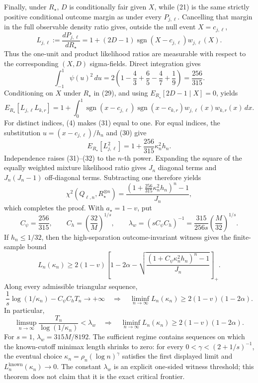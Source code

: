 Finally, under \(R_\star\), \(D\) is conditionally fair given \(X\), while (21) is the same strictly positive conditional outcome margin as under every \(P_{j,\ell}\).  Cancelling that margin in the full observable density ratio gives, outside the null event \(X=c_{j,\ell}\),
\[
L_{j,\ell}:=\frac{dP_{j,\ell}}{dR_\star}
=1+(2D-1)\operatorname{sgn}(X-c_{j,\ell})w_{j,\ell}(X).
\tag{29}
\]
Thus the one-unit and product likelihood ratios are measurable with respect to the corresponding \((X,D)\) sigma-fields.  Direct integration gives
\[
\int_{-1}^{1}\psi(u)^2\,du
=2\left(1-\frac43+\frac65-\frac47+\frac19\right)
=\frac{256}{315}.
\tag{30}
\]
Conditioning on \(X\) under \(R_\star\) in (29), and using \(E_{R_\star}[2D-1\mid X]=0\), yields
\[
E_{R_\star}[L_{j,\ell}L_{k,r}]
=1+\int_0^1
\operatorname{sgn}(x-c_{j,\ell})
\operatorname{sgn}(x-c_{k,r})
w_{j,\ell}(x)w_{k,r}(x)\,dx.
\tag{31}
\]
For distinct indices, (4) makes (31) equal to one.  For equal indices, the substitution \(u=(x-c_{j,\ell})/h_n\) and (30) give
\[
E_{R_\star}[L_{j,\ell}^2]
=1+\frac{256}{315}\kappa_n^2h_n.
\tag{32}
\]
Independence raises (31)--(32) to the \(n\)-th power.  Expanding the square of the equally weighted mixture likelihood ratio gives \(J_n\) diagonal terms and \(J_n(J_n-1)\) off-diagonal terms.  Subtracting one therefore yields
\[
\chi^2(Q_{\ell,n},R_\star^{\otimes n})
=\frac{\left(1+\frac{256}{315}\kappa_n^2h_n\right)^n-1}{J_n},
\]
which completes the proof.
With \(a_\star=1-v\), put
\[
C_\psi=\frac{256}{315},
\qquad
C_h=\left(\frac{32}{M}\right)^{1/s},
\qquad
\lambda_w=(sC_\psi C_h)^{-1}
=\frac{315}{256s}\left(\frac{M}{32}\right)^{1/s}.
\]
If \(h_n\le1/32\), then the high-separation outcome-invariant witness gives the finite-sample bound
\[
L_n(\kappa_n)
\ge2(1-v)\left[
1-2\alpha-
\sqrt{\frac{\left(1+C_\psi\kappa_n^2h_n\right)^n-1}{J_n}}
\right]_+.
\]
Along every admissible triangular sequence,
\[
\frac1s\log(1/\kappa_n)-C_\psi C_hT_n\longrightarrow+\infty
\quad\Longrightarrow\quad
\liminf_{n\to\infty}L_n(\kappa_n)
\ge2(1-v)(1-2\alpha).
\]
In particular,
\[
\limsup_{n\to\infty}
\frac{T_n}{\log(1/\kappa_n)}<\lambda_w
\quad\Longrightarrow\quad
\liminf_{n\to\infty}L_n(\kappa_n)
\ge2(1-v)(1-2\alpha).
\]
For \(s=1\), \(\lambda_w=315M/8192\).  The sufficient regime contains sequences on which the known-cutoff minimax length shrinks to zero: for every \(0<\gamma<(2+1/s)^{-1}\), the eventual choice \(\kappa_n=\rho_n(\log n)^\gamma\) satisfies the first displayed limit and \(L_n^{\mathrm{known}}(\kappa_n)\to0\).  The constant \(\lambda_w\) is an explicit one-sided witness threshold; this theorem does not claim that it is the exact critical frontier.

